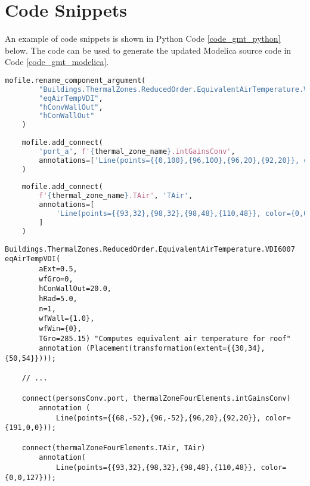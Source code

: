 \section{Code Snippets}

An example of code snippets is shown in Python Code \ref{code_gmt_python} below. The code can be used to generate the updated Modelica source code in Code \ref{code_gmt_modelica}.

\begin{lstlisting}[language=Python, backgroundcolor=\color{aliceblue}, caption={Python snippets of Modelica Builder commands}, captionpos=b, label={code_gmt_python}]
	mofile.rename_component_argument(
		"Buildings.ThermalZones.ReducedOrder.EquivalentAirTemperature.VDI6007",
		"eqAirTempVDI",
		"hConvWallOut",
		"hConWallOut"
	)
	
	mofile.add_connect(
		'port_a', f'{thermal_zone_name}.intGainsConv',
		annotations=['Line(points={{0,100},{96,100},{96,20},{92,20}}, color={191,0,0})']
	)
	
	mofile.add_connect(
		f'{thermal_zone_name}.TAir', 'TAir',
		annotations=[
			'Line(points={{93,32},{98,32},{98,48},{110,48}}, color={0,0,127})'
		]
	)
\end{lstlisting}

\bigskip

\begin{lstlisting}[language=Modelica, backgroundcolor=\color{aliceblue}, caption={Updated Modelica code after Modelica Builder}, captionpos=b, label={code_gmt_modelica}]
	Buildings.ThermalZones.ReducedOrder.EquivalentAirTemperature.VDI6007 eqAirTempVDI(
		aExt=0.5,
		wfGro=0,
		hConWallOut=20.0,
		hRad=5.0,
		n=1,
		wfWall={1.0},
		wfWin={0},
		TGro=285.15) "Computes equivalent air temperature for roof"
		annotation (Placement(transformation(extent={{30,34},{50,54}})));
	
	// ... 
	
	connect(personsConv.port, thermalZoneFourElements.intGainsConv)
		annotation (
			Line(points={{68,-52},{96,-52},{96,20},{92,20}}, color={191,0,0}));
	
	connect(thermalZoneFourElements.TAir, TAir) 
		annotation(
			Line(points={{93,32},{98,32},{98,48},{110,48}}, color={0,0,127}));		
\end{lstlisting}




